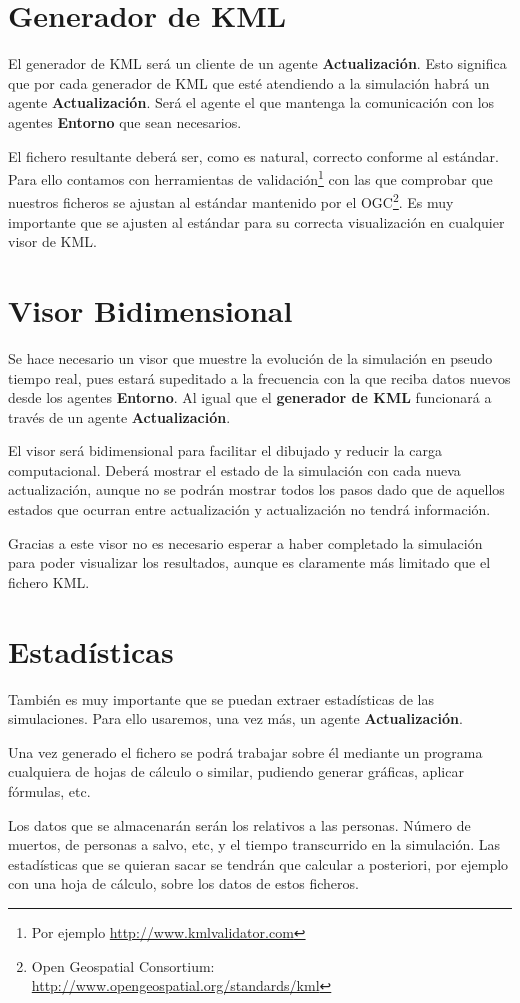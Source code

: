 \section*{Generador de KML}

El generador de KML será un cliente de un agente {\bf Actualización}. Esto
significa que por cada generador de KML que esté atendiendo a la simulación
habrá un agente {\bf Actualización}. Será el agente el que mantenga la
comunicación con los agentes {\bf Entorno} que sean necesarios.

El fichero resultante deberá ser, como es natural, correcto conforme al
estándar. Para ello contamos con herramientas de
validación\footnote{Por ejemplo \url{http://www.kmlvalidator.com}} con las que
comprobar que nuestros ficheros se ajustan al estándar mantenido por el
OGC\footnote{Open Geospatial Consortium:
\url{http://www.opengeospatial.org/standards/kml}}. Es muy importante que se
ajusten al estándar para su correcta visualización en cualquier visor de KML.

\section*{Visor Bidimensional}

Se hace necesario un visor que muestre la evolución de la simulación en pseudo
tiempo real, pues estará supeditado a la frecuencia con la que reciba datos
nuevos desde los agentes {\bf Entorno}. Al igual que el {\bf generador de KML}
funcionará a través de un agente {\bf Actualización}.

El visor será bidimensional para facilitar el dibujado y reducir la carga
computacional. Deberá mostrar el estado de la simulación con cada nueva
actualización, aunque no se podrán mostrar todos los pasos dado que de aquellos
estados que ocurran entre actualización y actualización no tendrá información.

Gracias a este visor no es necesario esperar a haber completado la simulación
para poder visualizar los resultados, aunque es claramente más limitado que el
fichero KML.

\section*{Estadísticas}

También es muy importante que se puedan extraer estadísticas de las
simulaciones. Para ello usaremos, una vez más, un agente {\bf Actualización}.

Una vez generado el fichero se podrá trabajar sobre él mediante un programa
cualquiera de hojas de cálculo o similar, pudiendo generar gráficas, aplicar
fórmulas, etc.

Los datos que se almacenarán serán los relativos a las personas. Número de
muertos, de personas a salvo, etc, y el tiempo transcurrido en la simulación.
Las estadísticas que se quieran sacar se tendrán que calcular a posteriori, por
ejemplo con una hoja de cálculo, sobre los datos de estos ficheros.

